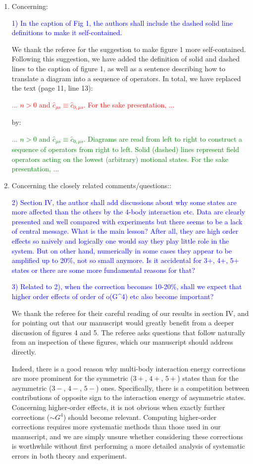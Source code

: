 \documentclass[preprint]{revtex4-1}
\renewcommand{\c}{\hat{c}}
\newcommand{\1}{\mathds{1}}
\newcommand{\blue}[1]{\textcolor{blue}{#1}}
\newcommand{\red}[1]{\textcolor{red}{#1}}
\newcommand{\green}[1]{\textcolor{green}{#1}}
\begin{document}
\begin{enumerate}
\item Concerning:

  \blue{1) In the caption of Fig 1, the authors shall include the
    dashed solid line definitions to make it self-contained.}

  We thank the referee for the suggestion to make figure 1 more
  self-contained.  Following this suggestion, we have added the
  definition of solid and dashed lines to the caption of figure 1, as
  well as a sentence describing how to translate a diagram into a
  sequence of operators.  In total, we have replaced the text (page
  11, line 13):

  \red{... $n>0$ and $\c_{\mu s}\equiv\c_{0,\mu s}$.  For the sake
    presentation, ...}

  by:

  \green{... $n>0$ and $\c_{\mu s}\equiv\c_{0,\mu s}$.  Diagrams are
    read from left to right to construct a sequence of operators from
    right to left.  Solid (dashed) lines represent field operators
    acting on the lowest (arbitrary) motional states.  For the sake
    presentation, ...}


\item Concerning the closely related comments/questions::

  \blue{2) Section IV, the author shall add discussions about why some
    states are more affected than the others by the 4-body interaction
    etc.  Data are clearly presented and well compared with
    experiments but there seems to be a lack of central message. What
    is the main lesson? After all, they are high order effects so
    naively and logically one would say they play little role in the
    system. But on other hand, numerically in some cases they appear
    to be amplified up to 20\%, not so small anymore.  Is it
    accidental for 3+, 4+, 5+ states or there are some more
    fundamental reasons for that?}

  \blue{3) Related to 2), when the correction becomes 10-20\%, shall
    we expect that higher order effects of order of o(G\^{}4) etc also
    become important?}

  We thank the referee for their careful reading of our results in
  section IV, and for pointing out that our manuscript would greatly
  benefit from a deeper discussion of figures 4 and 5.  The referee
  asks questions that follow naturally from an inspection of these
  figures, which our manuscript should address directly.

  Indeed, there is a good reason why multi-body interaction energy
  corrections are more prominent for the symmetric ($3+$, $4+$, $5+$)
  states than for the asymmetric ($3-$, $4-$, $5-$) ones.
  Specifically, there is a competition between contributions of
  opposite sign to the interaction energy of asymmetric states.
  Concerning higher-order effects, it is not obvious when exactly
  further corrections ($\sim G^4$) should become relevant.  Computing
  higher-order corrections requires more systematic methods than those
  used in our manuscript, and we are simply unsure whether considering
  these corrections is worthwhile without first performing a more
  detailed analysis of systematic errors in both theory and
  experiment.


\end{enumerate}
\end{document}
